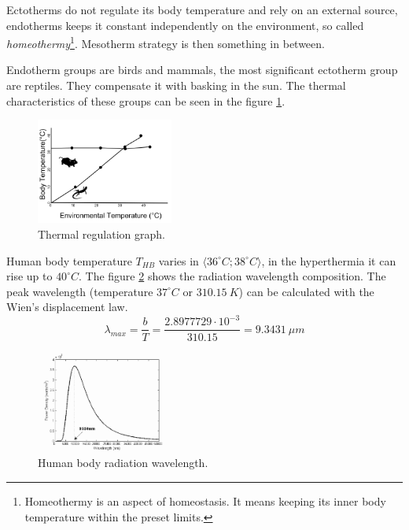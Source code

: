 Ectotherms do not regulate its body temperature and rely on an external source, endotherms keeps it
constant independently on the environment, so called {\it homeothermy}\footnote{Homeothermy is an aspect
of homeostasis. It means keeping its inner body temperature within the preset limits.}. Mesotherm
strategy is then something in between.

Endotherm groups are birds and mammals, the most significant ectotherm group are reptiles. They compensate
it with basking in the sun. The thermal characteristics of these groups can be seen in the figure \ref{fig:thermoregulatory}.

\begin{figure}[h!]
\begin{center}
\includegraphics[width=0.4\textwidth]{obrazky-figures/thermoregulatory.png}
\caption{Thermal regulation graph.\label{fig:thermoregulatory}\cite{thermoregulatory}}
\end{center}    
\end{figure}

Human body temperature $T_{HB}$ varies in $\langle 36^{\circ}C; 38^{\circ}C \rangle$, in the hyperthermia
it can rise up to $40^{\circ}C$. The figure \ref{fig:bodywavelength} shows the radiation wavelength composition.
The peak wavelength (temperature $37^{\circ}C$ or $310.15~K$) can be calculated with the Wien's displacement law.
\begin{equation}
\lambda_{max}=\frac{b}{T}=\frac{2.8977729 \cdot 10^{-3}}{310.15} = 9.3431~\mu m
\end{equation}

\begin{figure}[h!]
\begin{center}
\includegraphics[width=0.4\textwidth]{obrazky-figures/bodyradiation.png}
\caption{Human body radiation wavelength.\cite{BodyRadiation}\label{fig:bodywavelength}}
\end{center}    
\end{figure}





